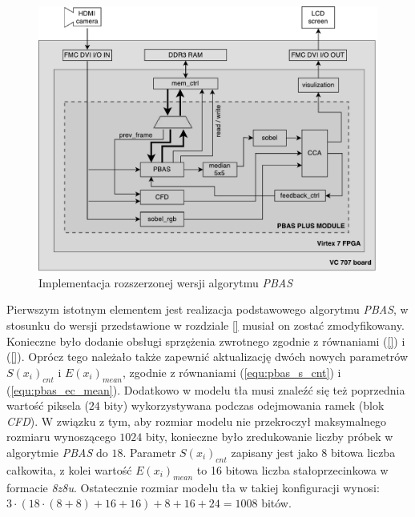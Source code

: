 	\begin{figure}[h!]
		\centering
		\includegraphics[scale=0.6]{img/4/pbas_plus.pdf}
		\caption{Implementacja rozszerzonej wersji algorytmu \textit{PBAS}}
		\label{fig:pbas_plus_diagram}
	\end{figure}
	
Pierwszym istotnym elementem jest realizacja podstawowego algorytmu \textit{PBAS}, w stosunku do wersji przedstawione w rozdziale \ref{} musiał on zostać zmodyfikowany. Konieczne było dodanie obsługi sprzężenia zwrotnego zgodnie z równaniami (\ref{}) i (\ref{}). Oprócz tego należało także zapewnić aktualizację dwóch nowych parametrów $S(x_i)_{cnt}$ i $E(x_i)_{mean}$, zgodnie z równaniami (\ref{equ:pbas_s_cnt}) i (\ref{equ:pbas_ec_mean}). Dodatkowo w modelu tła musi znaleźć się też poprzednia wartość piksela ($24$ bity) wykorzystywana podczas odejmowania ramek (blok \textit{CFD}). W związku z tym, aby rozmiar modelu nie przekroczył maksymalnego rozmiaru wynoszącego $1024$ bity, konieczne było zredukowanie liczby próbek w algorytmie \textit{PBAS} do $18$. Parametr $S(x_i)_{cnt}$ zapisany jest jako 8 bitowa liczba całkowita, z kolei wartość $E(x_i)_{mean}$ to 16 bitowa liczba stałoprzecinkowa w formacie \textit{8z8u}. Ostatecznie rozmiar modelu tła w takiej konfiguracji wynosi: $3 \cdot (18 \cdot (8+8) + 16 + 16) + 8 + 16 + 24 = 1008$ bitów.

